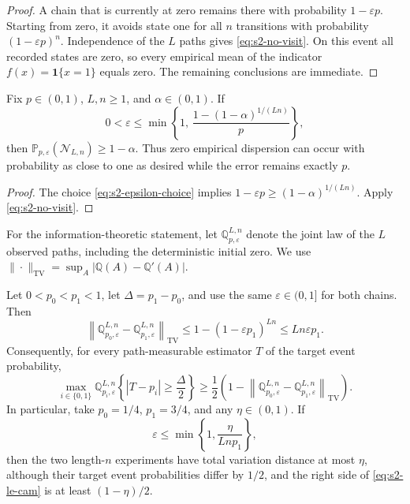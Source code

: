 \begin{proof}
A chain that is currently at zero remains there with probability
\(1-\varepsilon p\).  Starting from zero, it avoids state one for all \(n\)
transitions with probability \((1-\varepsilon p)^n\).  Independence of the
\(L\) paths gives \eqref{eq:s2-no-visit}.  On this event all recorded states
are zero, so every empirical mean of the indicator \(f(x)=\mathbf 1\{x=1\}\)
equals zero.  The remaining conclusions are immediate.
\end{proof}

\begin{corollary}
\label{cor:s2-arbitrary-false-precision}
Fix \(p\in(0,1)\), \(L,n\geq1\), and \(\alpha\in(0,1)\).  If
\begin{equation}
 0<\varepsilon
 \leq
 \min\left\{
  1,\,
  \frac{1-(1-\alpha)^{1/(Ln)}}{p}
 \right\},
 \label{eq:s2-epsilon-choice}
\end{equation}
then
\(\mathbb P_{p,\varepsilon}(\mathcal N_{L,n})\geq1-\alpha\).
Thus zero empirical dispersion can occur with probability as close to one as
desired while the error remains exactly \(p\).
\end{corollary}

\begin{proof}
The choice \eqref{eq:s2-epsilon-choice} implies
\(1-\varepsilon p\geq(1-\alpha)^{1/(Ln)}\).  Apply
\eqref{eq:s2-no-visit}.
\end{proof}

For the information-theoretic statement, let
\(\mathbb Q_{p,\varepsilon}^{L,n}\) denote the joint law of the \(L\) observed
paths, including the deterministic initial zero.  We use
\(\|\cdot\|_{\mathrm{TV}}=\sup_A|\mathbb Q(A)-\mathbb Q'(A)|\).

\begin{theorem}
\label{thm:s2-indistinguishability}
Let \(0<p_0<p_1<1\), let \(\Delta=p_1-p_0\), and use the same
\(\varepsilon\in(0,1]\) for both chains.  Then
\begin{equation}
 \left\|
  \mathbb Q_{p_0,\varepsilon}^{L,n}
  -
  \mathbb Q_{p_1,\varepsilon}^{L,n}
 \right\|_{\mathrm{TV}}
 \leq
 1-(1-\varepsilon p_1)^{Ln}
 \leq
 Ln\varepsilon p_1.
 \label{eq:s2-path-tv}
\end{equation}
Consequently, for every path-measurable estimator \(T\) of the target event
probability,
\begin{equation}
 \max_{i\in\{0,1\}}
 \mathbb Q_{p_i,\varepsilon}^{L,n}
 \left\{
  |T-p_i|\geq\frac{\Delta}{2}
 \right\}
 \geq
 \frac12
 \left(
  1-
  \left\|
   \mathbb Q_{p_0,\varepsilon}^{L,n}
   -
   \mathbb Q_{p_1,\varepsilon}^{L,n}
  \right\|_{\mathrm{TV}}
 \right).
 \label{eq:s2-le-cam}
\end{equation}
In particular, take \(p_0=1/4\), \(p_1=3/4\), and any
\(\eta\in(0,1)\).  If
\[
 \varepsilon
 \leq
 \min\left\{1,\frac{\eta}{Ln p_1}\right\},
\]
then the two length-\(n\) experiments have total variation distance at most
\(\eta\), although their target event probabilities differ by \(1/2\), and
the right side of \eqref{eq:s2-le-cam} is at least
\((1-\eta)/2\).
\end{theorem}

